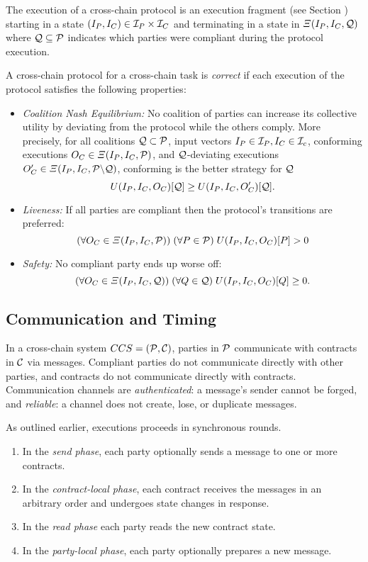 The execution of a cross-chain protocol is an execution fragment (see Section ) starting in a state $(I_P,I_C) \in {\mathcal I}_P \times {\mathcal I}_C$ and terminating in a state in $\Xi(I_P,I_C,{\mathcal Q})$ where ${\mathcal Q} \subseteq {\mathcal P}$ indicates which parties were compliant during the protocol execution.   

A cross-chain protocol for a cross-chain task is \emph{correct} if each execution of the protocol satisfies the following properties:
\begin{itemize}
\item 
\emph{Coalition Nash Equilibrium:}
No coalition of parties can increase its collective utility
by deviating from the protocol while the others comply.
More precisely,
for all coalitions ${\mathcal Q} \subset {\mathcal P}$,
input vectors $I_P \in {\mathcal I}_P, I_C \in {\mathcal I}_c$,
conforming executions $O_C \in \Xi(I_P, I_C, {\mathcal P})$,
and ${\mathcal Q}$-deviating executions $O_C' \in  \Xi(I_P, I_C, {\mathcal P} \backslash {\mathcal Q})$,
conforming is the better strategy for ${\mathcal Q}$
\begin{equation*}
U(I_P,I_C,O_C)[{\mathcal Q}] \geq U(I_P,I_C,O_C')[{\mathcal Q}].
\end{equation*}        
\item
\emph{Liveness:}
If all parties are compliant
then the protocol's transitions are preferred:
\begin{equation}
  \eqnlabel{protocol:prefer}
  (\forall O_C \in \Xi(I_P,I_C,\cP))\;
  (\forall P \in \cP)\;
  U(I_P,I_C,O_C)[P] > 0
\end{equation}

\item
\emph{Safety:}
  No compliant party ends up worse off:
\begin{equation*}
(\forall O_C \in \Xi(I_P,I_C,{\mathcal Q}))\;
  (\forall Q \in {\mathcal Q})\;
  U(I_P,I_C,O_C)[Q] \geq 0.
  \end{equation*}
\end{itemize}

\subsection{Communication and Timing}
In a cross-chain system $CCS=({\mathcal P},{\mathcal C})$,
parties in ${\mathcal P}$ communicate with contracts in ${\mathcal C}$ via messages.
Compliant parties do not communicate directly with other parties,
and contracts do not communicate directly with contracts.
Communication channels are \emph{authenticated}: a message's sender cannot be forged,
and \emph{reliable}: a channel does not create, lose, or duplicate messages.

As outlined earlier,
executions proceeds in synchronous rounds.
\begin{enumerate}
\item
  In the \emph{send phase},
  each party optionally sends a message to one or more contracts.
\item
  In the \emph{contract-local phase},
  each contract receives the messages in an arbitrary order
  and undergoes state changes in response.
\item
  In the \emph{read phase}
  each party reads the new contract state.
\item
  In the \emph{party-local phase},
  each party optionally prepares a new message.
\end{enumerate}
